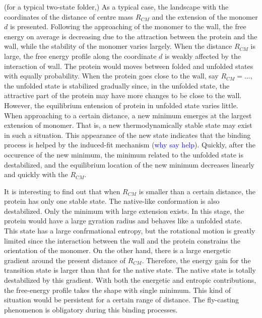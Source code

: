 \documentclass[preprint,preprintnumbers,amsmath,amssymb,showpacs,aps,pre]{revtex4-1}
\begin{document}
(for a typical two-state folder,)
As a typical case, the landscape with the coordinates of the distance of
centre mass $R_{CM}$ and the extension of the monomer $d$ is presented.
Following the approaching of the monomer to the wall, the free energy
on average is decreasing due to the attraction between the protein and
the wall, while the stability of the monomer varies largely. When the
distance $R_{CM}$ is large, the free energy profile along the coordinate
$d$ is weakly affected by the interaction of wall. The protein would
moves between folded and unfolded states with equally probability. When the
protein goes close to the wall, say $R_{CM}=...$, the unfolded state is
stabilized gradually since, in the unfolded state, the attractive part of the
protein may have more changes to be close to the wall. However, the
equilibrium entension of protein in unfolded state varies little. When
approaching to a certain distance, a new minimum emerges at the largest
extension of monomer. That is, a new thermodynamically stable state may exist
in such a situation. This appearance of the new state indicates that the
binding process is helped by the induced-fit mechanism (\textcolor{blue}{why
say help}). Quickly, after the occurence of the new minimum, the minimum
related to the unfolded state is destabilized, and the equilibrium location of
the new minimum decreases linearly and quickly with the $R_{CM}$.

It is interesting to find out that when $R_{CM}$ is smaller than a certain
distance, the protein has only one stable state. The native-like conformation
is also destabilized. Only the minimum with large extension exists. In this
stage, the protein would have a large gyration radius and behaves like a
unfolded state. This state has a large confrmational entropy, but the
rotational motion is greatly limited since the interaction between the wall and
the protein constrains the orientation of the monomer. On the other hand,
there is a large energetic gradient around the present distance of
$R_{CM}$. Therefore, the energy gain for the transition state is larger than
that for the native state. The native state is totally destabilized by this
gradient. With both the energetic and entropic contributions, the free-energy
profile takes the shape with single minimum. This kind of situation would be
persistent for a certain range of distance. The fly-casting phenomenon is
obligatory during this binding processes.
\end{document}

